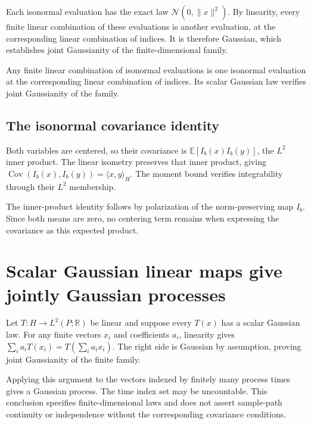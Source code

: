 \documentclass[11pt,a4paper]{report}
\begin{document}
Each isonormal evaluation has the exact law \(\mathcal N(0,\|x\|^2)\). By linearity, every finite linear combination of these evaluations is another evaluation, at the corresponding linear combination of indices. It is therefore Gaussian, which establishes joint Gaussianity of the finite-dimensional family.



Any finite linear combination of isonormal evaluations is one isonormal evaluation at the corresponding linear combination of indices. Its scalar Gaussian law verifies joint Gaussianity of the family.

\subsection{\texorpdfstring{The isonormal covariance identity}{The isonormal covariance identity}}
\label{report-step-UnadjustedLangevin-GaussianHilbert-lean-26}


Both variables are centered, so their covariance is \(\mathbb E[I_b(x)I_b(y)]\), the \(L^2\) inner product. The linear isometry preserves that inner product, giving \(\operatorname{Cov}(I_b(x),I_b(y))=\langle x,y\rangle_H\). The moment bound verifies integrability through their \(L^2\) membership.



The inner-product identity follows by polarization of the norm-preserving map \(I_b\). Since both means are zero, no centering term remains when expressing the covariance as this expected product.

\section{\texorpdfstring{Scalar Gaussian linear maps give jointly Gaussian processes}{Scalar Gaussian linear maps give jointly Gaussian processes}}
\label{proof-module-UnadjustedLangevin-GaussianLinearProcess-lean}


Let \(T:H\to L^2(P;\mathbb R)\) be linear and suppose every \(T(x)\) has a scalar Gaussian law. For any finite vectors \(x_i\) and coefficients \(a_i\), linearity gives \(\sum_i a_iT(x_i)=T(\sum_i a_ix_i)\). The right side is Gaussian by assumption, proving joint Gaussianity of the finite family.



Applying this argument to the vectors indexed by finitely many process times gives a Gaussian process. The time index set may be uncountable. This conclusion specifies finite-dimensional laws and does not assert sample-path continuity or independence without the corresponding covariance conditions.
\end{document}
